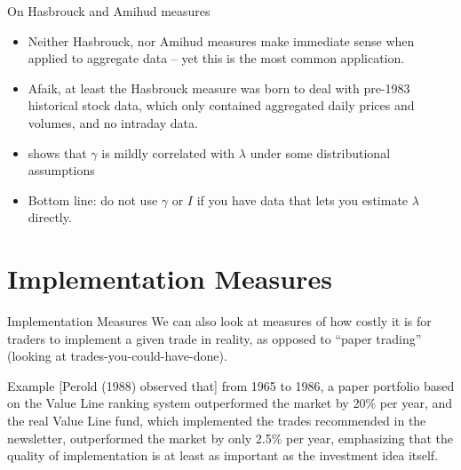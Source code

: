 \documentclass[english,10pt
,aspectratio=169
]{beamer}
\begin{document}
\begin{frame}{On Hasbrouck and Amihud measures}
\begin{itemize}
	\item Neither Hasbrouck, nor Amihud measures make immediate sense when applied to aggregate data -- yet this is the most common application.
	
	\item Afaik, at least the Hasbrouck measure was born to deal with pre-1983 historical stock data, which only contained aggregated daily prices and volumes, and no intraday data. 
	
	\item \cite{hasbrouck_empirical_2007} shows that $\gamma$ is mildly correlated with $\lambda$ under some distributional assumptions
	
	\item Bottom line: do not use $\gamma$ or $I$ if you have data that lets you estimate $\lambda$ directly.
\end{itemize}
\end{frame}


\section{Implementation Measures}

\begin{frame}{Implementation Measures}
	We can also look at measures of how costly it is for traders to implement a given trade in reality, as opposed to ``paper trading'' (looking at trades-you-could-have-done).
	
	\pause\bigskip 
	\begin{block}{Example}
		[Perold (1988) observed that] from 1965 to 1986, a paper portfolio based
		on the Value Line ranking system outperformed the market by 20\% per year,
		and the real Value Line fund, which implemented the trades recommended in
		the newsletter, outperformed the market by only 2.5\% per year, emphasizing
		that the quality of implementation is at least as important as the investment
		idea itself. \citep{anand_performance_2012}
	\end{block}
\end{frame}
\end{document}
